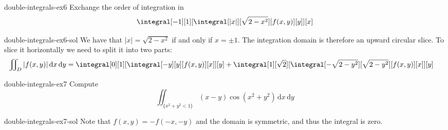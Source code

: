 \documentclass[preview]{standalone}
\begin{document}
\begin{snippetexercise}{double-integrals-ex6}{}
    Exchange the order of integration in
    \[
        \integral[-1][1][
            \integral[|x|][\sqrt{2-x^2}][f(x,y)][y]
        ][x]
    \]
\end{snippetexercise}

\begin{snippetsolution}{double-integrals-ex6-sol}{}
    We have that \(|x| = \sqrt{2-x^2}\) if and only if \(x = \pm 1\).
    The integration domain is therefore an upward circular slice.
    To slice it horizontally we need to split it into two parts:
    \begin{align*}
        \iint\nolimits_D |f(x,y)| \,\text{d}x\,\text{d}y 
        &= \integral[0][1][
            \integral[-y][y][
                f(x,y)
            ][x]
        ][y] + \integral[1][\sqrt 2][
            \integral[-\sqrt{2-y^2}][\sqrt{2 - y^2}][
                f(x,y)
            ][x]
        ][y]
    \end{align*}
\end{snippetsolution}

\begin{snippetexercise}{double-integrals-ex7}{}
    Compute
    \[
        \iint\nolimits_{\{x^2 + y^2 < 1\}} (x-y)\cos(x^2 + y^2) \,\text{d}x\,\text{d}y 
    \]
\end{snippetexercise}

\begin{snippetsolution}{double-integrals-ex7-sol}{}
    Note that \(f(x,y) = -f(-x, -y)\) and the domain is symmetric, and thus the integral is zero.
\end{snippetsolution}
\end{document}
